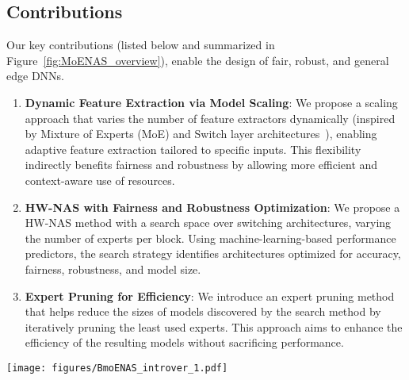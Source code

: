 \subsection{Contributions}

Our key contributions (listed below and summarized in Figure~\ref{fig:MoENAS_overview}), enable the design of fair, robust, and general edge DNNs.
%
%
\begin{enumerate}[leftmargin=*]
%
    \item \textbf{Dynamic Feature Extraction via Model Scaling}: We propose a scaling approach that varies the number of feature extractors dynamically (inspired by Mixture of Experts (MoE) and Switch layer architectures~\cite{fedus2022switch}), enabling adaptive feature extraction tailored to specific inputs. This flexibility indirectly benefits fairness and robustness by allowing more efficient and context-aware use of resources.
    \item \textbf{HW-NAS with Fairness and Robustness Optimization}: We propose a HW-NAS method with a search space over switching architectures, varying the number of experts per block. Using machine-learning-based performance predictors, the search strategy identifies architectures optimized for accuracy, fairness, robustness, and model size.
    \item \textbf{Expert Pruning for Efficiency}: We introduce an expert pruning method that helps reduce the sizes of models discovered by the search method by iteratively pruning the least used experts. This approach aims to enhance the efficiency of the resulting models without sacrificing performance.
\end{enumerate}
%
\begin{figure*}[ht]
    \centering \texttt{[image: figures/BmoENAS\_introver\_1.pdf]}
    \caption{Summary of MoENAS contributions: (1) Replace the FFN layer with a Switch FFN layer, (2) Search within the expert mixing space for optimal architectures (according to accuracy, fairness, robustness, generalization). (3) Pruning based on expert importance for better efficiency. }
    \label{fig:MoENAS_overview}
\end{figure*}

